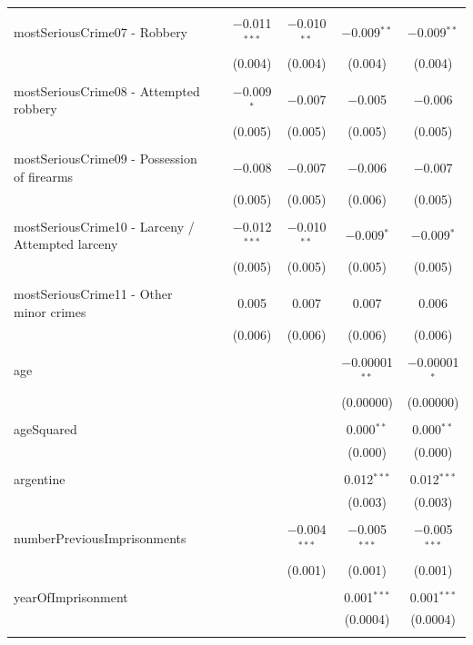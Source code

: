 \documentclass[a4paper,12pt]{article}
\begin{document}
\begin{table}[!htbp]
{\begin{tabular}{@{\extracolsep{5pt}}lccccc}
  & & & & & \\ 
 mostSeriousCrime07 - Robbery &  & $-$0.011$^{***}$ & $-$0.010$^{**}$ & $-$0.009$^{**}$ & $-$0.009$^{**}$ \\ 
  &  & (0.004) & (0.004) & (0.004) & (0.004) \\ 
  & & & & & \\ 
 mostSeriousCrime08 - Attempted robbery &  & $-$0.009$^{*}$ & $-$0.007 & $-$0.005 & $-$0.006 \\ 
  &  & (0.005) & (0.005) & (0.005) & (0.005) \\ 
  & & & & & \\ 
 mostSeriousCrime09 - Possession of firearms &  & $-$0.008 & $-$0.007 & $-$0.006 & $-$0.007 \\ 
  &  & (0.005) & (0.005) & (0.006) & (0.005) \\ 
  & & & & & \\ 
 mostSeriousCrime10 - Larceny / Attempted larceny &  & $-$0.012$^{***}$ & $-$0.010$^{**}$ & $-$0.009$^{*}$ & $-$0.009$^{*}$ \\ 
  &  & (0.005) & (0.005) & (0.005) & (0.005) \\ 
  & & & & & \\ 
 mostSeriousCrime11 - Other minor crimes &  & 0.005 & 0.007 & 0.007 & 0.006 \\ 
  &  & (0.006) & (0.006) & (0.006) & (0.006) \\ 
  & & & & & \\ 
 age &  &  &  & $-$0.00001$^{**}$ & $-$0.00001$^{*}$ \\ 
  &  &  &  & (0.00000) & (0.00000) \\ 
  & & & & & \\ 
 ageSquared &  &  &  & 0.000$^{**}$ & 0.000$^{**}$ \\ 
  &  &  &  & (0.000) & (0.000) \\ 
  & & & & & \\ 
 argentine &  &  &  & 0.012$^{***}$ & 0.012$^{***}$ \\ 
  &  &  &  & (0.003) & (0.003) \\ 
  & & & & & \\ 
 numberPreviousImprisonments &  &  & $-$0.004$^{***}$ & $-$0.005$^{***}$ & $-$0.005$^{***}$ \\ 
  &  &  & (0.001) & (0.001) & (0.001) \\ 
  & & & & & \\ 
 yearOfImprisonment &  &  &  & 0.001$^{***}$ & 0.001$^{***}$ \\ 
  &  &  &  & (0.0004) & (0.0004) \\ 
  & & & & & \\ 
  

\end{tabular}}
\end{table}
\end{document}
